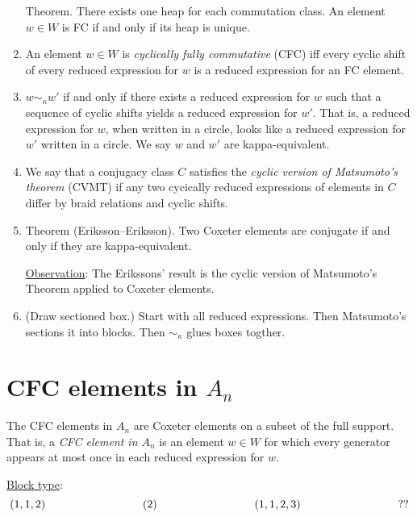 \documentclass{article}
\newcommand*\circled[1]{\tikz[baseline=(char.base)]{\node[shape=circle,draw,inner sep=1pt] (char) {#1};}}
\theoremstyle{definition}
\theoremstyle{theorem}
\begin{document}
\begin{enumerate}[label=(\alph*)]
	Theorem. \circled{1} There exists one heap for each commutation class. \circled{2} An element $w \in W$ is FC if and only if its heap is unique.

\item An element $w \in W$ is \emph{cyclically fully commutative} (CFC) iff every cyclic shift of every reduced expression for $w$ is a reduced expression for an FC element.

\item $w \sim_\kappa w'$ if and only if there exists a reduced expression for $w$ such that a sequence of cyclic shifts yields a reduced expression for $w'$. That is, a reduced expression for $w$, when written in a circle, looks like a reduced expression for $w'$ written in a circle. We say $w$ and $w'$ are kappa-equivalent.

\item We say that a conjugacy class $C$ satisfies the \emph{cyclic version of Matsumoto's theorem} (CVMT) if any two cycically reduced expressions of elements in $C$ differ by braid relations and cyclic shifts.

\item Theorem (Eriksson--Eriksson). Two Coxeter elements are conjugate if and only if they are kappa-equivalent.

	\underline{Observation}: The Erikssons' result is the cyclic version of Matsumoto's Theorem applied to Coxeter elements.
	
\item (Draw sectioned box.) Start with all reduced expressions. Then Matsumoto's sections it into blocks. Then $\sim_\kappa$ glues boxes togther.
\end{enumerate}


\section{CFC elements in $A_n$}
	The CFC elements in $A_n$ are Coxeter elements on a subset of the full support. That is, a \emph{CFC element in $A_n$} is an element $w \in W$ for which every generator appears at most once in each reduced expression for $w$.

    \underline{Block type}:\\
    \vspace{0.75in}
    $$(1,1,2) \hspace{1.2in} (2) \hspace{1.2in} (1,1,2,3) \hspace{1.2in} ??$$
	
\end{document}

